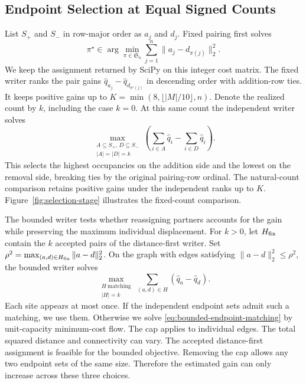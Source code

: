 \subsection{Endpoint Selection at Equal Signed Counts}
\label{sec:selection}
List \(S_+\) and \(S_-\) in row-major order as \(a_j\) and \(d_j\). Fixed pairing first solves
\begin{equation}
\pi^\star\in\arg\min_{\pi\in\mathfrak S_n}
  \sum_{j=1}^n\|a_j-d_{\pi(j)}\|_2^2 .
\label{eq:fixed-assignment}
\end{equation}
We keep the assignment returned by SciPy on this integer cost matrix. The fixed writer ranks the pair gains \(\widehat q_{a_j}-\widehat q_{d_{\pi^\star(j)}}\) in descending order with addition-row ties. It keeps positive gains up to \(K=\min(8,\lfloor |M|/10\rfloor,n)\). Denote the realized count by \(k\), including the case \(k=0\). At this same count the independent writer solves
\begin{equation}
\max_{\substack{A\subseteq S_+,\,D\subseteq S_-\\ |A|=|D|=k}}
  \left(\sum_{i\in A}\widehat q_i-\sum_{i\in D}\widehat q_i\right).
\label{eq:independent-estimated-gain}
\end{equation}
This selects the highest occupancies on the addition side and the lowest on the removal side, breaking ties by the original pairing-row ordinal. The natural-count comparison retains positive gains under the independent ranks up to \(K\). Figure~\ref{fig:selection-stage} illustrates the fixed-count comparison.

The bounded writer tests whether reassigning partners accounts for the gain while preserving the maximum individual displacement. For \(k>0\), let \(H_{\rm fix}\) contain the \(k\) accepted pairs of the distance-first writer. Set \(\rho^2=\max_{(a,d)\in H_{\rm fix}}\|a-d\|_2^2\). On the graph with edges satisfying \(\|a-d\|_2^2\le\rho^2\), the bounded writer solves
\begin{equation}
\max_{\substack{H\ \text{matching}\\ |H|=k}}
\sum_{(a,d)\in H}(\widehat q_a-\widehat q_d).
\label{eq:bounded-endpoint-matching}
\end{equation}
Each site appears at most once. If the independent endpoint sets admit such a matching, we use them. Otherwise we solve \eqref{eq:bounded-endpoint-matching} by unit-capacity minimum-cost flow. The cap applies to individual edges. The total squared distance and connectivity can vary. The accepted distance-first assignment is feasible for the bounded objective. Removing the cap allows any two endpoint sets of the same size. Therefore the estimated gain can only increase across these three choices.


